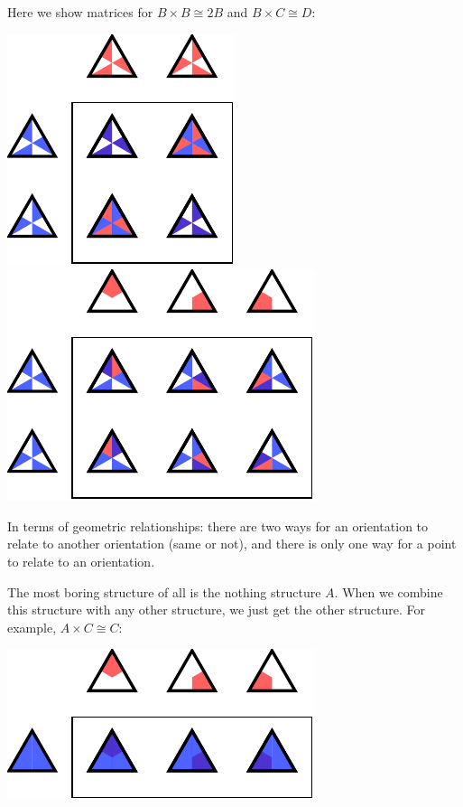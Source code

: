 \documentclass[11pt,oneside]{article}
\begin{document}
\begin{samepage}
Here we show matrices for $B\times B\cong 2B$ and 
$B\times C\cong D:$
\begin{center}
\includegraphics[]{pic-triangle-orient-orient-matrix.pdf} 
\ \ \ \ \ \ \ 
\includegraphics[]{pic-triangle-point-orient-matrix.pdf} 
\end{center}
\end{samepage}
In terms of geometric relationships: 
there are two ways for an orientation to relate to another
orientation (same or not), and there is only one way
for a point to relate to an orientation.

The most boring structure of all is the nothing structure $A$.
When we combine this structure with any other structure, we
just get the other structure.
For example, $A\times C\cong C:$
\begin{center}
\includegraphics[]{pic-triangle-nothing-point-matrix.pdf} 
\end{center}
\end{document}
